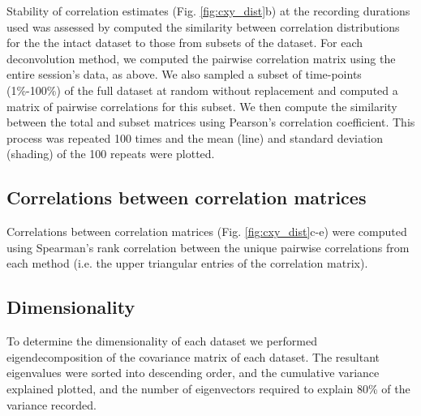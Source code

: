 \documentclass[a4paper,11pt]{article}
\begin{document}
Stability of correlation estimates (Fig. \ref{fig:cxy_dist}b) at the recording durations used was assessed by computed the similarity between correlation distributions for the the intact dataset to those from subsets of the dataset. For each deconvolution method, we computed the pairwise correlation matrix using the entire session’s data, as above. We also sampled a subset of time-points (1\%-100\%) of the full dataset at random without replacement and computed a matrix of pairwise correlations for this subset. We then compute the similarity between the total and subset matrices using Pearson’s correlation coefficient. This process was repeated 100 times and the mean (line) and standard deviation (shading) of the 100 repeats were plotted.

\subsection{Correlations between correlation matrices}
Correlations between correlation matrices (Fig. \ref{fig:cxy_dist}c-e) were computed using Spearman's rank correlation between the unique pairwise correlations from each method (i.e. the upper triangular entries of the correlation matrix). %

\subsection{Dimensionality}
To determine the dimensionality of each dataset we performed eigendecomposition of the covariance matrix of each dataset. The resultant eigenvalues were sorted into descending order, and the cumulative variance explained plotted, and the number of eigenvectors required to explain 80\% of the variance recorded. %




\end{document}
